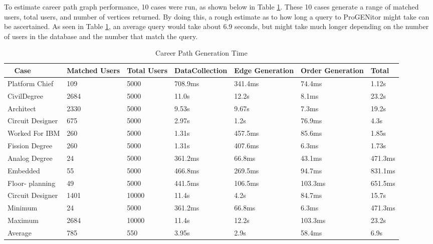 To estimate career path graph performance, 10 cases were run, as shown below in
Table \ref{table:career performance}.  These 10 cases generate a range of
matched users, total users, and number of vertices returned.  By doing this, a
rough estimate as to how long a query to ProGENitor might take can be ascertained.  As
seen in Table \ref{table:career performance}, an average query would take about
6.9 seconds, but might take much longer depending on the number of users in the
database and the number that match the query.

\begin{table}[H]
  \centering
  \begin{tabular}{|p{17mm}|p{16mm}|p{10mm}|p{18mm}|p{19mm}|p{20mm}|p{14mm}|}
  \hline
  \
  Case&Matched Users&Total Users&Data\newline Collection&Edge\newline
  Generation&Order Generation&Total\\
  \hline\hline
  Platform Chief&109&5000&708.9ms&341.4ms&74.4ms&1.12s\\ \hline
  Civil\newline Degree&2684&5000&11.0s&12.2s&8.1ms&23.2s\\ \hline 
  Architect&2330&5000&9.53s&9.67s&7.3ms&19.2s\\ \hline
  Circuit Designer&675&5000&2.97s&1.2s&76.9ms&4.3s\\ \hline
  Worked For IBM&260&5000&1.31s&457.5ms&85.6ms&1.85s\\ \hline
  Fission Degree&260&5000&1.31s&407.6ms&6.3ms&1.73s\\ \hline
  Analog Degree&24&5000&361.2ms&66.8ms&43.1ms&471.3ms\\ \hline
  Embedded&55&5000&466.8ms&269.5ms&94.7ms&831.1ms\\ \hline
  Floor- \newline planning&49&5000&441.5ms&106.5ms&103.3ms&651.5ms\\ \hline
  Circuit Designer&1401&10000&11.4s&4.2s&84.7ms&15.7s\\ \hline
  \hline\hline
  Minimum&24&5000&361.2ms&66.8ms&6.3ms&471.3ms\\ \hline
  Maximum&2684&10000&11.4s&12.2s&103.3ms&23.2s\\ \hline
  Average&785&550&3.95s&2.9s&58.4ms&6.9s\\ \hline
  \end{tabular}
  \caption{Career Path Generation Time}
  \label{table:career performance}
\end{table}

